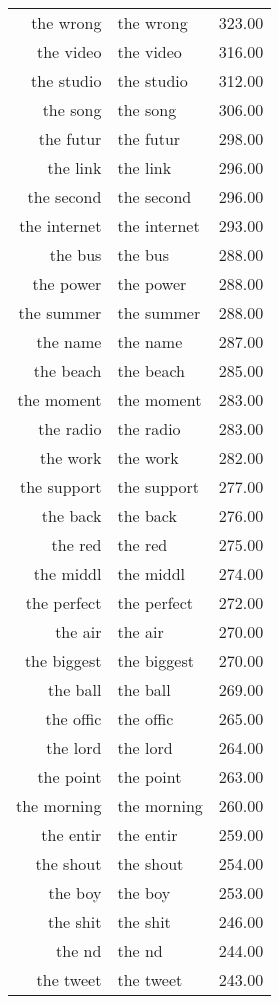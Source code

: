 \begin{table}[ht]
\begin{tabular}{rlr}
  the wrong & the wrong & 323.00 \\ 
  the video & the video & 316.00 \\ 
  the studio & the studio & 312.00 \\ 
  the song & the song & 306.00 \\ 
  the futur & the futur & 298.00 \\ 
  the link & the link & 296.00 \\ 
  the second & the second & 296.00 \\ 
  the internet & the internet & 293.00 \\ 
  the bus & the bus & 288.00 \\ 
  the power & the power & 288.00 \\ 
  the summer & the summer & 288.00 \\ 
  the name & the name & 287.00 \\ 
  the beach & the beach & 285.00 \\ 
  the moment & the moment & 283.00 \\ 
  the radio & the radio & 283.00 \\ 
  the work & the work & 282.00 \\ 
  the support & the support & 277.00 \\ 
  the back & the back & 276.00 \\ 
  the red & the red & 275.00 \\ 
  the middl & the middl & 274.00 \\ 
  the perfect & the perfect & 272.00 \\ 
  the air & the air & 270.00 \\ 
  the biggest & the biggest & 270.00 \\ 
  the ball & the ball & 269.00 \\ 
  the offic & the offic & 265.00 \\ 
  the lord & the lord & 264.00 \\ 
  the point & the point & 263.00 \\ 
  the morning & the morning & 260.00 \\ 
  the entir & the entir & 259.00 \\ 
  the shout & the shout & 254.00 \\ 
  the boy & the boy & 253.00 \\ 
  the shit & the shit & 246.00 \\ 
  the nd & the nd & 244.00 \\ 
  the tweet & the tweet & 243.00 \\ 

\end{tabular}
\end{table}

